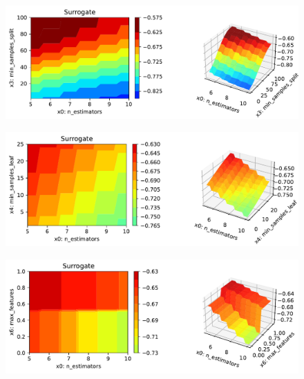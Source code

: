 \documentclass[
  letterpaper,
  DIV=11,
  numbers=noendperiod]{scrreprt}
\begin{document}
\begin{figure}[H]

{\centering \includegraphics{16_spot_hpt_sklearn_multiclass_classification_randomforest_files/figure-pdf/cell-48-output-3.pdf}

}

\end{figure}

\begin{figure}[H]

{\centering \includegraphics{16_spot_hpt_sklearn_multiclass_classification_randomforest_files/figure-pdf/cell-48-output-4.pdf}

}

\end{figure}

\begin{figure}[H]

{\centering \includegraphics{16_spot_hpt_sklearn_multiclass_classification_randomforest_files/figure-pdf/cell-48-output-5.pdf}

}

\end{figure}
\end{document}
